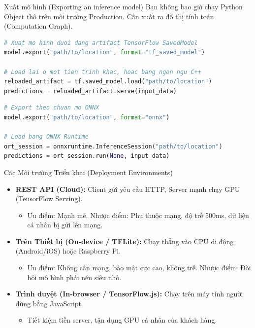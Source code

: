 \documentclass[aspectratio=169]{beamer}
\begin{document}
\begin{frame}[fragile]{Xuất mô hình (Exporting an inference model)}
    Bạn không bao giờ chạy Python Object thô trên môi trường Production. Cần xuất ra đồ thị tính toán (Computation Graph).
    
    \begin{lstlisting}[language=Python, caption=Xuất mô hình ra TensorFlow SavedModel]
# Xuat mo hinh duoi dang artifact TensorFlow SavedModel
model.export("path/to/location", format="tf_saved_model")

# Load lai o mot tien trinh khac, hoac bang ngon ngu C++
reloaded_artifact = tf.saved_model.load("path/to/location")
predictions = reloaded_artifact.serve(input_data)
    \end{lstlisting}
    
    \begin{lstlisting}[language=Python, caption=Xuất mô hình ra ONNX]
# Export theo chuan mo ONNX 
model.export("path/to/location", format="onnx")

# Load bang ONNX Runtime
ort_session = onnxruntime.InferenceSession("path/to/location")
predictions = ort_session.run(None, input_data)
    \end{lstlisting}
\end{frame}

\begin{frame}{Các Môi trường Triển khai (Deployment Environments)}
    \begin{itemize}
        \item \textbf{REST API (Cloud):} Client gửi yêu cầu HTTP, Server mạnh chạy GPU (TensorFlow Serving). 
        \begin{itemize}
            \item Ưu điểm: Mạnh mẽ. Nhược điểm: Phụ thuộc mạng, độ trễ 500ms, dữ liệu cá nhân bị gửi lên mạng.
        \end{itemize}
        \item \textbf{Trên Thiết bị (On-device / TFLite):} Chạy thẳng vào CPU di động (Android/iOS) hoặc Raspberry Pi.
        \begin{itemize}
            \item Ưu điểm: Không cần mạng, bảo mật cực cao, không trễ. Nhược điểm: Đòi hỏi mô hình phải nén siêu nhỏ.
        \end{itemize}
        \item \textbf{Trình duyệt (In-browser / TensorFlow.js):} Chạy trên máy tính người dùng bằng JavaScript.
        \begin{itemize}
            \item Tiết kiệm tiền server, tận dụng GPU cá nhân của khách hàng.
        \end{itemize}
    \end{itemize}
\end{frame}
\end{document}
